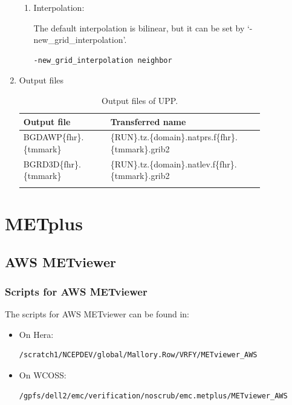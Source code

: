 \documentclass[11pt,fleqn]{report}              %
\begin{document}
\begin{enumerate}
\begin{enumerate}
\item Interpolation:

The default interpolation is bilinear, but it can be set by `-new\_grid\_interpolation'.
\lstset{language=bash}   
\begin{lstlisting}[frame=trBL]
-new_grid_interpolation neighbor
\end{lstlisting}

\end{enumerate}


\item Output files
{
\fontsize{10}{12}\selectfont
\begin{longtable}{p{0.3\linewidth} | p{0.53\linewidth} }
\hline
\hline
 Output file & Transferred name  \\
\hline
 BGDAWP\{fhr\}.\{tmmark\} & \{RUN\}.tz.\{domain\}.natprs.f\{fhr\}.\{tmmark\}.grib2 \\
 BGRD3D\{fhr\}.\{tmmark\} & \{RUN\}.tz.\{domain\}.natlev.f\{fhr\}.\{tmmark\}.grib2 \\
\hline
\caption{Output files of UPP.}
\label{table:fv3_upp_output}
\end{longtable}
}

\end{enumerate}




\chapter{METplus}
\label{chpt:metplus}


\section{AWS METviewer}               
\label{sec:aws_metviewer}


\subsection{Scripts for AWS METviewer}
\label{subsec:aws_metviewer_scripts}

The scripts for AWS METviewer can be found in:
\begin{itemize}
\item On Hera:
\lstset{language=bash}   
\begin{lstlisting}[frame=trBL]
/scratch1/NCEPDEV/global/Mallory.Row/VRFY/METviewer_AWS
\end{lstlisting}

\item On WCOSS:
\lstset{language=bash}   
\begin{lstlisting}[frame=trBL]
/gpfs/dell2/emc/verification/noscrub/emc.metplus/METviewer_AWS
\end{lstlisting}

\end{itemize}
\end{document}
